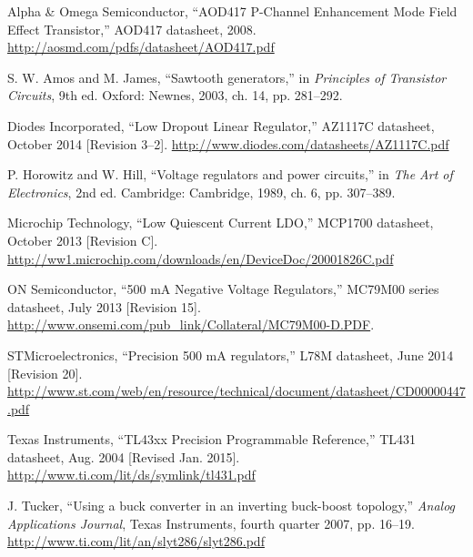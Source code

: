 \documentclass[article,oneside]{memoir}
\begin{document}
\newpage
\begin{thebibliography}{9}

Alpha \& Omega Semiconductor, ``AOD417 P-Channel Enhancement Mode Field Effect Transistor,''
AOD417 datasheet, 2008. \url{http://aosmd.com/pdfs/datasheet/AOD417.pdf}

S. W. Amos and M. James, ``Sawtooth generators,'' in
\emph{Principles of Transistor Circuits}, 9th ed. Oxford: Newnes, 2003, ch. 14, pp. 281--292.

Diodes Incorporated, ``Low Dropout Linear Regulator,'' AZ1117C datasheet,
October 2014 [Revision 3--2].
\url{http://www.diodes.com/datasheets/AZ1117C.pdf}

P. Horowitz and W. Hill, ``Voltage regulators and power circuits,'' in
\emph{The Art of Electronics}, 2nd ed. Cambridge: Cambridge, 1989, ch. 6, pp. 307--389.

Microchip Technology, ``Low Quiescent Current LDO,'' MCP1700 datasheet,
October 2013 [Revision C].
\url{http://ww1.microchip.com/downloads/en/DeviceDoc/20001826C.pdf}

ON Semiconductor, ``500 mA Negative Voltage Regulators,'' MC79M00 series datasheet,
July 2013 [Revision 15].
\url{http://www.onsemi.com/pub_link/Collateral/MC79M00-D.PDF}.

STMicroelectronics, ``Precision 500 mA regulators,'' L78M datasheet, June 2014 [Revision 20].
\url{http://www.st.com/web/en/resource/technical/document/datasheet/CD00000447.pdf}

Texas Instruments, ``TL43xx Precision Programmable Reference,''
TL431 datasheet, Aug. 2004 [Revised Jan. 2015]. \url{http://www.ti.com/lit/ds/symlink/tl431.pdf}

J. Tucker, ``Using a buck converter in an inverting buck-boost topology,''
\emph{Analog Applications Journal}, Texas Instruments, fourth quarter 2007, pp. 16--19.
\url{http://www.ti.com/lit/an/slyt286/slyt286.pdf}
\end{thebibliography}
\end{document}
